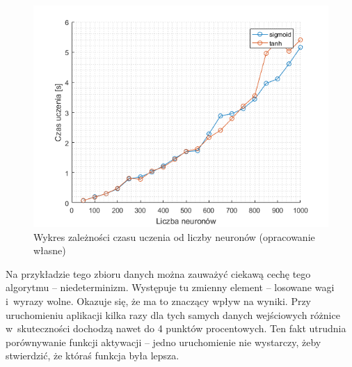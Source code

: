 \documentclass[pl]{minipw} %
\begin{document}
\begin{figure}[H]
\centering
\includegraphics[width=\textwidth]{forest_wydajnosc.png}
\caption[Wykres zależności czasu uczenia od liczby neuronów]{Wykres zależności czasu uczenia od liczby neuronów (opracowanie własne)}
\label{forest_wydajnosc}
\end{figure}

Na przykładzie tego zbioru danych można zauważyć ciekawą cechę tego algorytmu -- niedeterminizm.
Występuje tu zmienny element -- losowane wagi i~wyrazy wolne.
Okazuje się, że ma to znaczący wpływ na wyniki.
Przy uruchomieniu aplikacji kilka razy dla tych samych danych wejściowych różnice w~skuteczności dochodzą nawet do 4 punktów procentowych.
Ten fakt utrudnia porównywanie funkcji aktywacji -- jedno uruchomienie nie wystarczy, żeby stwierdzić, że któraś funkcja była lepsza.
\end{document}
